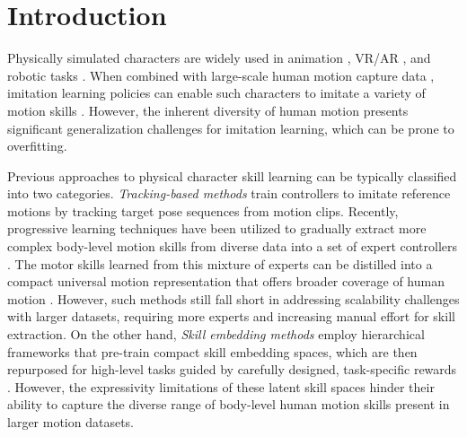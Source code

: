 \section{Introduction}
\label{sec:intro}
Physically simulated characters are widely used in animation \cite{:10.2312/SCA/SCA12/221-230,Wang2024PacerPlus}, VR/AR \cite{Luo_2024_CVPR, 10.1145/3550469.3555411}, and robotic tasks \cite{he2024omnih2o,he2024learning}. When combined with large-scale human motion capture data \cite{AMASS:ICCV:2019}, imitation learning policies can enable such characters to imitate a variety of motion skills \cite{Luo2023PerpetualHC, luo2024universal, juravsky2024superpadl, tessler2024masked}. However, the inherent diversity of human motion presents significant generalization challenges for imitation learning, which can be prone to overfitting.

Previous approaches to physical character skill learning can be typically classified into two categories. \textit{Tracking-based methods} train controllers to imitate reference motions by tracking target pose sequences from motion clips. Recently, progressive learning techniques have been utilized to gradually extract more complex body-level motion skills from diverse data into a set of expert controllers \cite{Luo2023PerpetualHC, juravsky2024superpadl}. The motor skills learned from this mixture of experts can be distilled into a compact universal motion representation that offers broader coverage of human motion \cite{luo2024universal}. However, such methods still fall short in addressing scalability challenges with larger datasets, requiring more experts and increasing manual effort for skill extraction. On the other hand, \textit{Skill embedding methods} employ hierarchical frameworks that pre-train compact skill embedding spaces, which are then repurposed for high-level tasks guided by carefully designed, task-specific rewards \cite{dou2022case,2022-TOG-ASE,juravsky2022padl,tessler2023calm,zhang2023vid2player3d}. However, the expressivity limitations of these latent skill spaces hinder their ability to capture the diverse range of body-level human motion skills present in larger motion datasets.

